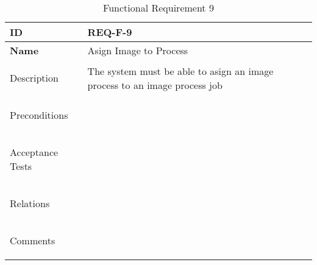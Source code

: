 \begin{table}[H]
    \begin{tabular}[t]{ | >{\bfseries}l | p{9.5cm} |}

    \hline
    ID
    &  REQ-F-9 \\ \hline

    Name
    & Asign Image to Process \\ \hline

    Description
    & The system must be able to asign an image process to an image process job \\ \hline

    Preconditions
    &  \\ \hline

    Acceptance Tests
    & \\ \hline

    Relations
    &  \\ \hline

    Comments
    &  \\ \hline

    \end{tabular}

    \caption{Functional Requirement 9}
    \label{fig:req_f_9}

\end{table}